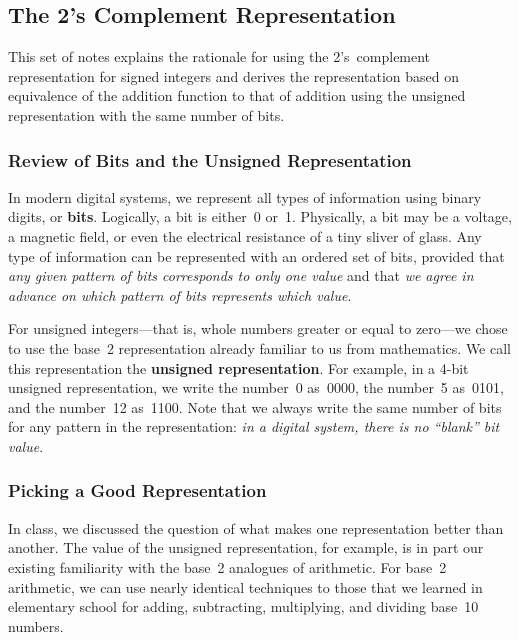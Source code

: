 \classtitle

\subsection{The 2's Complement Representation}

This set of notes explains the rationale for using the 2's~complement
representation for signed integers and derives the representation 
based on equivalence of the addition function to that of addition
using the unsigned representation with the same number of bits.\\

\subsubsection{Review of Bits and the Unsigned Representation}

In modern digital systems, we represent all types of information
using binary digits, or {\bf bits}\label{one:tcr:bits}.  Logically, a bit is either~0 or~1.
Physically, a bit may be a voltage, a magnetic field, or even the
electrical resistance of a tiny sliver of glass.
%
Any type of information can be represented with an ordered set of
bits, provided that 
{\em any given pattern of bits corresponds to only
one value} and that {\em we agree in advance on which pattern of bits
represents which value}.

For unsigned integers---that is, whole numbers greater or equal to
zero---we chose to use the base~2 representation already familiar to
us from mathematics.  We call this representation the {\bf unsigned
representation}\label{one:tcr:unsigned}.  For example, in a \mbox{4-bit} unsigned representation,
we write the number~0 as~0000, the number~5 as~0101, and the number~12
as~1100.  Note that we always write the same number of bits for any
pattern in the representation: {\em in a digital system, there is no 
``blank'' bit value}.\\

\subsubsection{Picking a Good Representation}

In class, we discussed the question of what makes one representation
better than another.  The value of the unsigned representation, for
example, is in part our existing familiarity with the base~2 analogues
of arithmetic.  For base~2 arithmetic, we can use nearly identical
techniques to those that we learned in elementary school for adding, 
subtracting, multiplying, and dividing base~10 numbers.

